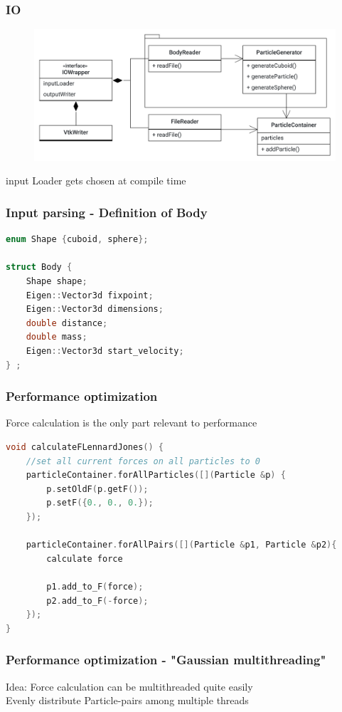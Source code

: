 \begin{frame}
	\frametitle{IO}
	\begin{figure}
		\centering
		\includegraphics[width=0.7\linewidth]{IOWrapper}
		\label{fig:iowrapper}
	\end{figure}
	\large
	\centering
	input Loader gets chosen at compile time
\end{frame}


\begin{frame}[fragile]
\frametitle{Input parsing - Definition of Body}
\vspace{0.7cm}

\begin{lstlisting}[language=C++]
enum Shape {cuboid, sphere};

struct Body {
	Shape shape;   
	Eigen::Vector3d fixpoint; 
	Eigen::Vector3d dimensions; 
	double distance;
	double mass;
	Eigen::Vector3d start_velocity;
} ;
\end{lstlisting}
\end{frame}

\begin{frame}[fragile]
	\frametitle{Performance optimization}
	\large
	Force calculation is the only part relevant to performance
	\begin{lstlisting}[language=C++]
    void calculateFLennardJones() {
	//set all current forces on all particles to 0
	particleContainer.forAllParticles([](Particle &p) {
		p.setOldF(p.getF());
		p.setF({0., 0., 0.});
	});
	
	particleContainer.forAllPairs([](Particle &p1, Particle &p2){
		calculate force 
		
		p1.add_to_F(force);
		p2.add_to_F(-force);
	});
}

	\end{lstlisting}

\end{frame}

\begin{frame}
	\frametitle{Performance optimization - "Gaussian multithreading"}
	\large
	Idea: Force calculation can be multithreaded quite easily \\
	Evenly distribute Particle-pairs among multiple threads
	 
	
\end{frame}

